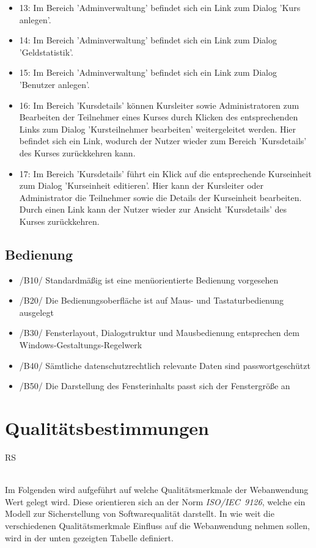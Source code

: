 \documentclass[a4paper]{scrreprt}
\begin{document}
\begin{itemize}
\begin{itemize}
	    \item 13: Im Bereich 'Adminverwaltung' befindet sich ein Link zum Dialog 'Kurs anlegen'.
	    \item 14: Im Bereich 'Adminverwaltung' befindet sich ein Link zum Dialog 'Geldstatistik'.
	    \item 15: Im Bereich 'Adminverwaltung' befindet sich ein Link zum Dialog 'Benutzer anlegen'.
	    \item 16: Im Bereich 'Kursdetails' können Kursleiter sowie Administratoren zum Bearbeiten der Teilnehmer eines Kurses durch Klicken des entsprechenden Links zum Dialog 'Kursteilnehmer bearbeiten' weitergeleitet werden. Hier befindet sich ein Link, wodurch der Nutzer wieder zum Bereich 'Kursdetails' des Kurses zurückkehren kann.
	    \item 17: Im Bereich 'Kursdetails' führt ein Klick auf die entsprechende Kurseinheit zum Dialog 'Kurseinheit editieren'. Hier kann der Kursleiter oder Administrator die Teilnehmer sowie die Details der Kurseinheit bearbeiten. Durch einen Link kann der Nutzer wieder zur Ansicht 'Kursdetails' des Kurses zurückkehren.
	    \end{itemize}
	    
	    \end{itemize}
        
    \section{Bedienung}       
	    \begin{itemize}
			\item /B10/ Standardmäßig ist eine menüorientierte Bedienung vorgesehen
			\item /B20/ Die Bedienungsoberfläche ist auf Maus- und Tastaturbedienung ausgelegt
			\item /B30/ Fensterlayout, Dialogstruktur und Mausbedienung entsprechen dem Windows-Gestaltungs-Regelwerk
			\item /B40/ Sämtliche datenschutzrechtlich relevante Daten sind passwortgeschützt
			\item /B50/ Die Darstellung des Fensterinhalts passt sich der Fenstergröße an
		\end{itemize}
            
            
         
\chapter{Qualitätsbestimmungen}
	\begin{tiny}
		RS
	\end{tiny}\\
	Im Folgenden wird aufgeführt auf welche Qualitätsmerkmale der Webanwendung Wert gelegt wird. Diese orientieren sich an der Norm \textit{ISO/IEC~9126}, welche ein Modell zur Sicherstellung von Softwarequalität darstellt. In wie weit die verschiedenen Qualitätsmerkmale Einfluss auf die Webanwendung nehmen sollen, wird in der unten gezeigten Tabelle definiert.\\
\end{document}
